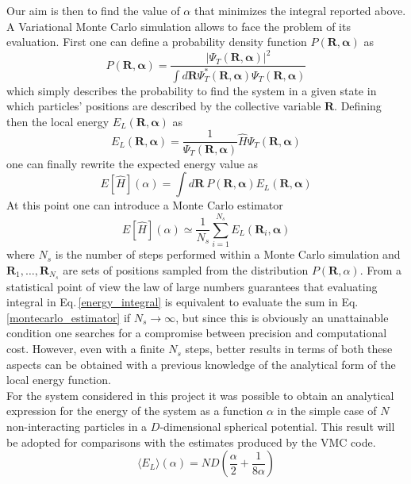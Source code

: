 Our aim is then to find the value of $\alpha$ that minimizes the integral reported above. A Variational Monte Carlo simulation allows to face the problem of its evaluation. First one can define a probability density function $P(\bm{R}, \bm{\alpha})$ as
\begin{equation*}
    P(\bm{R}, \bm{\alpha}) = \frac{\vert \Psi_T (\bm{R}, \bm{\alpha}) \vert^2}{\int d\bm{R} \Psi_T^*(\bm{R}, \bm{\alpha}) \Psi_T(\bm{R}, \bm{\alpha}) }
\end{equation*}
which simply describes the probability to find the system in a given state in which particles' positions are described by the collective variable $\bm{R}$. Defining then the local energy $E_L (\bm{R}, \bm{\alpha})$ as 
\begin{equation}
    E_L(\bm{R}, \bm{\alpha}) = \frac{1}{\Psi_T(\bm{R}, \bm{\alpha})} \hat{H} \Psi_T(\bm{R}, \bm{\alpha})
    \label{local_energy}
\end{equation}
one can finally rewrite the expected energy value as
\begin{equation}
    E[\hat{H}](\alpha) = \int d\bm{R} \ P(\bm{R}, \bm{\alpha}) E_L(\bm{R}, \bm{\alpha})
    \label{energy_integral}
\end{equation}
At this point one can introduce a Monte Carlo estimator
\begin{equation}
    E[\hat{H}](\alpha) \simeq \frac{1}{N_s} \sum_{i=1}^{N_s} E_L(\bm{R}_i, \bm{\alpha})
    \label{montecarlo_estimator}
\end{equation}
where $N_s$ is the number of steps performed within a Monte Carlo simulation and $\bm{R}_1, \dots, \bm{R}_{N_s}$ are sets of positions sampled from the distribution $P(\bm{R}, \alpha)$. From a statistical point of view the law of large numbers guarantees that evaluating integral in Eq.\,\ref{energy_integral} is equivalent to evaluate the sum in Eq.\,\ref{montecarlo_estimator} if $N_s \to \infty$, but since this is obviously an unattainable condition one searches for a compromise between precision and computational cost. However, even with a finite $N_s$ steps, better results in terms of both these aspects can be obtained with a previous knowledge of the analytical form of the local energy function. \\
For the system considered in this project it was possible to obtain an analytical expression for the energy of the system as a function $\alpha$ in the simple case of $N$ non-interacting particles in a $D$-dimensional spherical potential. This result will be adopted for comparisons with the estimates produced by the VMC code.
\begin{equation}
    \langle E_L \rangle (\alpha) = ND \left(\frac{\alpha}{2} + \frac{1}{8\alpha} \right)
    \label{energy_analitical}
\end{equation}



